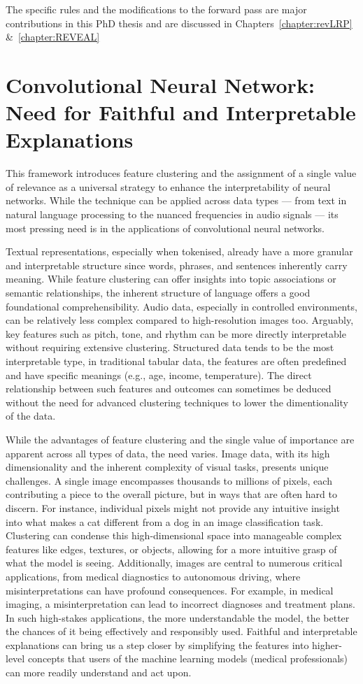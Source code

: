 The specific rules and the modifications to the forward pass are major contributions in this PhD thesis and are discussed in Chapters~\ref{chapter:revLRP} \&~\ref{chapter:REVEAL}

\section{Convolutional Neural Network: Need for Faithful and Interpretable Explanations}

This framework introduces feature clustering and the assignment of a single value of relevance as a universal strategy to enhance the interpretability of neural networks. While the technique can be applied across data types — from text in natural language processing to the nuanced frequencies in audio signals — its most pressing need is in the applications of convolutional neural networks.

Textual representations, especially when tokenised, already have a more granular and interpretable structure since words, phrases, and sentences inherently carry meaning. While feature clustering can offer insights into topic associations or semantic relationships, the inherent structure of language offers a good foundational comprehensibility. Audio data, especially in controlled environments, can be relatively less complex compared to high-resolution images too. Arguably, key features such as pitch, tone, and rhythm can be more directly interpretable without requiring extensive clustering. Structured data tends to be the most interpretable type, in traditional tabular data, the features are often predefined and have specific meanings (e.g., age, income, temperature). The direct relationship between such features and outcomes can sometimes be deduced without the need for advanced clustering techniques to lower the dimentionality of the data.

While the advantages of feature clustering and the single value of importance are apparent across all types of data, the need varies. Image data, with its high dimensionality and the inherent complexity of visual tasks, presents unique challenges. A single image encompasses thousands to millions of pixels, each contributing a piece to the overall picture, but in ways that are often hard to discern. For instance, individual pixels might not provide any intuitive insight into what makes a cat different from a dog in an image classification task. Clustering can condense this high-dimensional space into manageable complex features like edges, textures, or objects, allowing for a more intuitive grasp of what the model is seeing. Additionally, images are central to numerous critical applications, from medical diagnostics to autonomous driving, where misinterpretations can have profound consequences. For example, in medical imaging, a misinterpretation can lead to incorrect diagnoses and treatment plans. In such high-stakes applications, the more understandable the model, the better the chances of it being effectively and responsibly used. Faithful and interpretable explanations can bring us a step closer by simplifying the features into higher-level concepts that users of the machine learning models (\eg medical professionals) can more readily understand and act upon.



